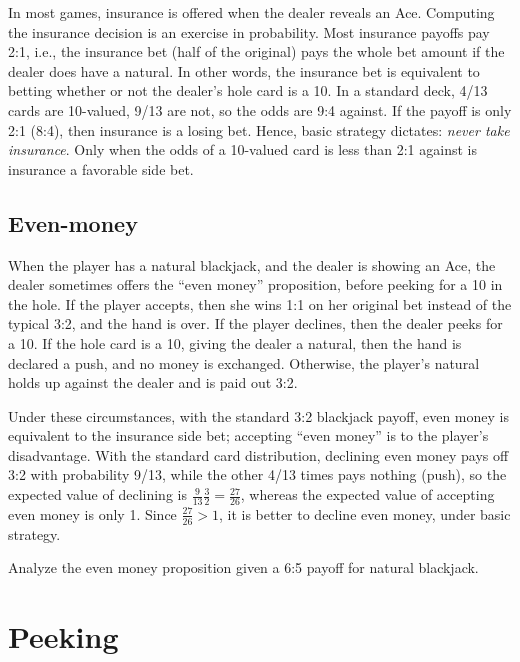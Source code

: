 In most games, insurance is offered when the dealer reveals an Ace.
Computing the insurance decision is an exercise in probability.
Most insurance payoffs pay 2:1, i.e., the insurance bet (half of the original)
pays the whole bet amount if the dealer does have a natural.
In other words, the insurance bet is equivalent to betting 
whether or not the dealer's hole card is a 10.
In a standard deck, 4/13 cards are 10-valued, 9/13 are not, 
so the odds are 9:4 against.  
If the payoff is only 2:1 (8:4), then insurance is a losing bet.
Hence, basic strategy dictates: \emph{never take insurance}.
Only when the odds of a 10-valued card is less than 2:1 against
is insurance a favorable side bet.

\subsection{Even-money}
\label{sec:basic:insurance:even-money}

When the player has a natural blackjack, and the dealer is showing an 
Ace, the dealer sometimes offers the ``even money'' proposition, 
before peeking for a 10 in the hole.
If the player accepts, then she wins 1:1 on her original bet
instead of the typical 3:2, and the hand is over.
If the player declines, then the dealer peeks for a 10.
If the hole card is a 10, giving the dealer a natural, then the hand
is declared a push, and no money is exchanged.
Otherwise, the player's natural holds up against the dealer
and is paid out 3:2.

Under these circumstances, with the standard 3:2 blackjack payoff, 
even money is equivalent to the insurance side bet;
accepting ``even money'' is to the player's disadvantage.
With the standard card distribution, 
declining even money pays off 3:2 with probability 9/13, 
while the other 4/13 times pays nothing (push), 
so the expected value of declining is
$\frac{9}{13}\frac{3}{2}=\frac{27}{26}$,
whereas the expected value of accepting even money is only 1.  
Since $\frac{27}{26}>1$, it is better to decline even money, 
under basic strategy.

\begin{exercise}
Analyze the even money proposition
given a 6:5 payoff for natural blackjack.
\end{exercise}

\section{Peeking}
\label{sec:basic:peeking}

